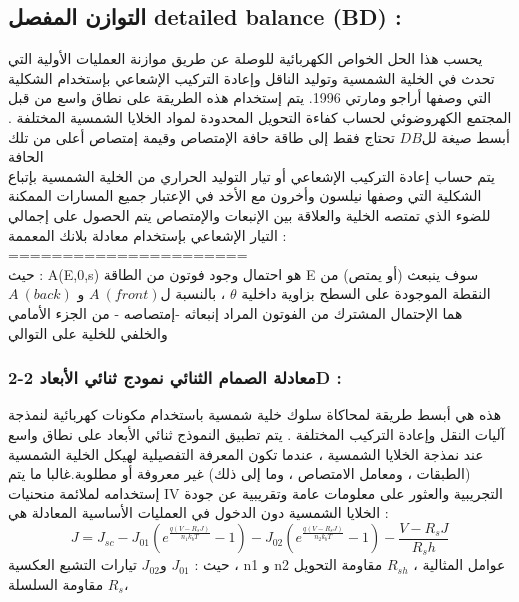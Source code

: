 \subsection{ التوازن المفصل  detailed balance (BD) :}
يحسب هذا الحل الخواص الكهربائية للوصلة عن طريق موازنة العمليات الأولية التي تحدث في الخلية الشمسية وتوليد الناقل وإعادة التركيب الإشعاعي بإستخدام الشكلية التي وصفها أراجو ومارتي 1996. يتم إستخدام هذه الطريقة على نطاق واسع من قبل المجتمع الكهروضوئي لحساب كفاءة التحويل المحدودة لمواد الخلايا الشمسية المختلفة . أبسط صيغة لل$ DB $ تحتاج فقط إلى طاقة حافة الإمتصاص وقيمة إمتصاص  أعلى من تلك الحافة \\
يتم حساب إعادة التركيب الإشعاعي أو تيار التوليد الحراري من الخلية الشمسية بإتباع الشكلية التي وصفها نيلسون وأخرون مع الأخد في الإعتبار جميع المسارات الممكنة للضوء الذي تمتصه الخلية والعلاقة بين الإنبعات والإمتصاص يتم الحصول على إجمالي التيار الإشعاعي بإستخدام معادلة بلانك المعممة :
\\
======================
\\
حيث : A(E,0,s)  هو احتمال وجود فوتون من الطاقة E سوف ينبعث (أو يمتص)  من النقطة الموجودة على السطح بزاوية داخلية $\theta$ ، 
بالنسبة ل$ A~(front)  $ و  $ A~ (back) $ هما الإحتمال المشترك من الفوتون المراد إنبعاثه -إمتصاصه - من الجزء الأمامي والخلفي للخلية  على التوالي
\subsubsection{2-معادلة الصمام الثنائي   نمودج ثنائي الأبعاد  2D :} 
هذه هي أبسط طريقة لمحاكاة سلوك خلية شمسية باستخدام مكونات كهربائية لنمذجة آليات النقل وإعادة التركيب المختلفة . يتم تطبيق النموذج ثنائي الأبعاد على نطاق واسع عند نمذجة الخلايا الشمسية   ، عندما تكون المعرفة التفصيلية لهيكل الخلية الشمسية (الطبقات ، ومعامل الامتصاص ، وما إلى ذلك) غير معروفة أو مطلوبة.غالبا ما يتم إستخدامه لملائمة منحنيات IV التجريبية والعثور على معلومات عامة وتقريبية عن جودة الخلايا الشمسية دون الدخول في العمليات الأساسية  
المعادلة هي :
\begin{equation}
	J=J_{sc}-J_{01}( e^\frac{ q(V-R_s J)}{ n_1 k_b T}-1)-J_{02}( e^\frac{ q(V-R_s J)}{ n_2 k_b T}-1) -\frac{ V-R_s J}{ R_sh}
\end{equation}
حيث : $ J_{01} $ و$ J_{02} $ تيارات التشبع العكسية ، n1 و n2 عوامل المثالية ، $ R_{sh }$ مقاومة التحويل ،$ R_s $ 
مقاومة السلسلة
